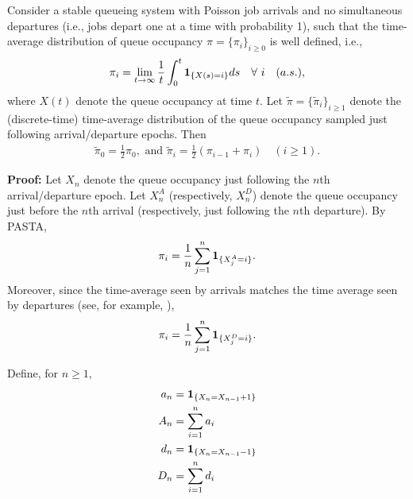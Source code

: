         \begin{lemma}
          \label{lemma:EMC_dist}
          Consider a stable queueing system with Poisson job arrivals
          and no simultaneous departures (i.e., jobs depart one at a
          time with probability 1), such that the time-average
          distribution of queue occupancy $\pi = \{\pi_i\}_{i \geq 0}$
          is well defined, i.e.,
	$$ 
	\pi_i  = \lim_{t \rightarrow \infty} \frac{1}{t} \int_{0}^t
	\boldsymbol{1}_{ \{ X(s)=i \} } ds \quad \forall \ i \quad (a.s.),
	$$ where $X(t)$ denote the queue occupancy at time $t.$ Let $\tilde{\pi} = \{\tilde{\pi}_i\}_{i \geq 1}$ denote the (discrete-time)
	time-average distribution of the queue occupancy sampled just
	following arrival/departure epochs. Then 
	\begin{eqnarray*} 
	\tilde{\pi}_0 = \frac{1}{2} \pi_0,  \mbox{ and }
	\tilde{\pi}_i = \frac{1}{2} (\pi_{i-1} + \pi_i)  \quad (i \geq 1).  \end{eqnarray*}
\end{lemma}
	{\bf Proof:} 
	Let $X_n$ denote the queue occupancy just following the $n$th
	arrival/departure epoch. Let $X^A_n$ (respectively, $X^D_n$) denote
	the queue occupancy just before the $n$th arrival (respectively, just following the $n$th departure).
		By PASTA,
		 $$
		 \pi_i = \frac{1}{n} \sum_{j = 1}^n \boldsymbol{1}_{ \{ X^A_j = i \} }.
		 $$ Moreover, since the time-average seen by arrivals matches the
	time average seen by departures (see, for
	example, \cite[Chapter~26]{Harchol-Balter}),
	 $$
	 \pi_i = \frac{1}{n} \sum_{j = 1}^n \boldsymbol{1}_{ \{ X^D_j = i \} }.
	 $$
	
	Define, for $n \geq 1,$
	\begin{align*}
	a_n &= \indicator{X_{n} = X_{n-1} + 1} \\ %
	A_n &= \sum_{i = 1}^n a_i \\%
	d_n &= \indicator{X_{n} = X_{n-1} - 1} \\ %
	D_n &= \sum_{i = 1}^n d_i %
	\end{align*}
	
